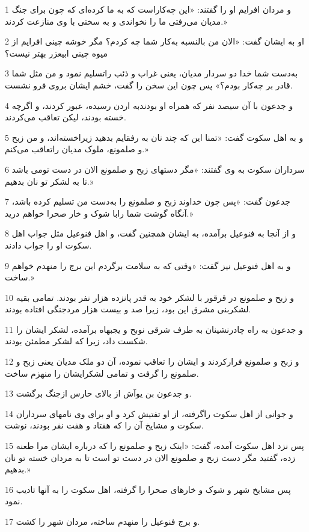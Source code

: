 \par 1 و مردان افرایم او را گفتند: «این چه‌کاراست که به ما کرده‌ای که چون برای جنگ مدیان می‌رفتی ما را نخواندی و به سختی با وی منازعت کردند.»
\par 2 او به ایشان گفت: «الان من بالنسبه به‌کار شما چه کردم؟ مگر خوشه چینی افرایم از میوه چینی ابیعزر بهتر نیست؟
\par 3 به‌دست شما خدا دو سردار مدیان، یعنی غراب و ذئب راتسلیم نمود و من مثل شما قادر بر چه‌کار بودم؟» پس چون این سخن را گفت، خشم ایشان بروی فرو نشست.
\par 4 و جدعون با آن سیصد نفر که همراه او بودندبه اردن رسیده، عبور کردند، و اگر‌چه خسته بودند، لیکن تعاقب می‌کردند.
\par 5 و به اهل سکوت گفت: «تمنا این که چند نان به رفقایم بدهید زیراخسته‌اند، و من زبح و صلمونع، ملوک مدیان راتعاقب می‌کنم.»
\par 6 سرداران سکوت به وی گفتند: «مگر دستهای زبح و صلمونع الان در دست تومی باشد تا به لشکر تو نان بدهیم.»
\par 7 جدعون گفت: «پس چون خداوند زبح و صلمونع را به‌دست من تسلیم کرده باشد، آنگاه گوشت شما رابا شوک و خار صحرا خواهم درید.»
\par 8 و از آنجا به فنوعیل برآمده، به ایشان همچنین گفت، و اهل فنوعیل مثل جواب اهل سکوت او را جواب دادند.
\par 9 و به اهل فنوعیل نیز گفت: «وقتی که به سلامت برگردم این برج را منهدم خواهم ساخت.»
\par 10 و زبح و صلمونع در قرقور با لشکر خود به قدر پانزده هزار نفر بودند. تمامی بقیه لشکربنی مشرق این بود، زیرا صد و بیست هزار مردجنگی افتاده بودند.
\par 11 و جدعون به راه چادرنشینان به طرف شرقی نوبح و یجبهاه برآمده، لشکر ایشان را شکست داد، زیرا که لشکر مطمئن بودند.
\par 12 و زبح و صلمونع فرارکردند و ایشان را تعاقب نموده، آن دو ملک مدیان یعنی زبح و صلمونع را گرفت و تمامی لشکرایشان را منهزم ساخت.
\par 13 و جدعون بن یوآش از بالای حارس ازجنگ برگشت.
\par 14 و جوانی از اهل سکوت راگرفته، از او تفتیش کرد و او برای وی نامهای سرداران سکوت و مشایخ آن را که هفتاد و هفت نفر بودند، نوشت.
\par 15 پس نزد اهل سکوت آمده، گفت: «اینک زبح و صلمونع را که درباره ایشان مرا طعنه زده، گفتید مگر دست زبح و صلمونع الان در دست تو است تا به مردان خسته تو نان بدهیم.»
\par 16 پس مشایخ شهر و شوک و خارهای صحرا را گرفته، اهل سکوت را به آنها تادیب نمود.
\par 17 و برج فنوعیل را منهدم ساخته، مردان شهر را کشت.
